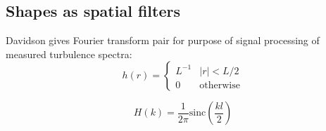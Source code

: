 \documentclass{jfm}
\begin{document}
\subsection{Shapes as spatial filters}

Davidson \cite{Davidson:2004} gives Fourier transform pair for purpose of signal processing of measured turbulence spectra:
\begin{equation}
h(r) = \left\{
\begin{array}{ll}
L^{-1} & |r|<L/2 \\
0 & \mbox{otherwise}
\end{array} \right.
\end{equation}


\begin{equation}
H(k) = \frac{1}{2\pi}\mbox{sinc}(\frac{kl}{2})
\end{equation}








%

\end{document}
